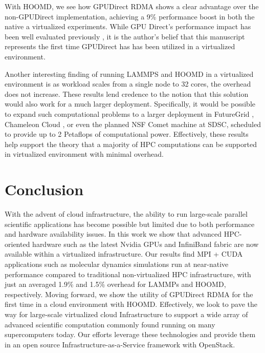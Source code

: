 \documentclass{sigplanconf}
\begin{document}
With HOOMD, we see how GPUDirect RDMA shows a clear advantage over the non-GPUDirect implementation, achieving a 9\% performance boost in both the native a virtualized experiments.  While GPU Direct's performance impact has been well evaluated previously \cite{GPUDirect}, it is the author's belief that this manuscript represents the first time GPUDirect has has been utilized in a virtualized environment.  

Another interesting finding of running LAMMPS and HOOMD in a virtualized environment is as workload scales from a single node to 32 cores, the overhead does not increase. These results lend credence to the notion that this solution would also work for a much larger deployment. Specifically, it would be possible to expand such computational problems to a larger deployment in FutureGrid \cite{fox2013futuregrid}, Chameleon Cloud \cite{www-chameleon}, or even the planned NSF Comet machine at SDSC, scheduled to provide up to 2 Petaflops of computational power. Effectively, these results help support the theory that a majority of HPC computations can be supported in virtualized environment with minimal overhead. 


\section{Conclusion}

With the advent of cloud infrastructure, the ability to run large-scale parallel scientific applications has become possible but limited due to both performance and hardware availability issues. In this work we show that advanced HPC-oriented hardware such as the latest Nvidia GPUs and InfiniBand fabric are now available within a virtualized infrastructure. Our results find MPI + CUDA applications such as molecular dynamics simulations run at near-native performance compared to traditional non-virtualized HPC infrastructure, with just an averaged 1.9\% and 1.5\% overhead for LAMMPs and HOOMD, respectively. Moving forward, we show the utility of GPUDirect RDMA for the first time in a cloud environment with HOOMD.  Effectively, we look to pave the way for large-scale virtualized cloud Infrastructure to support a wide array of advanced scientific computation commonly found running on many supercomputers today.  Our efforts leverage these technologies and provide them in an open source Infrastructure-as-a-Service framework with OpenStack.  






%



\end{document}
